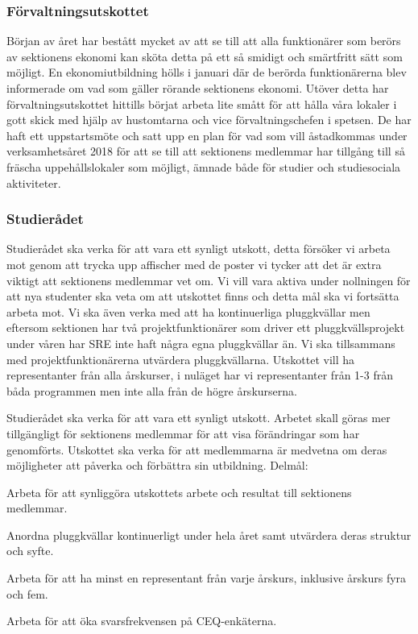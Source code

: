 \documentclass[../_main/handlingar.tex]{subfiles}
\begin{document}
\subsubsection*{Förvaltningsutskottet}
Början av året har bestått mycket av att se till att alla funktionärer som berörs av sektionens ekonomi kan sköta detta på ett så smidigt och smärtfritt sätt som möjligt.  
En ekonomiutbildning hölls i januari där de berörda funktionärerna blev informerade om vad som gäller rörande sektionens ekonomi.
Utöver detta har förvaltningsutskottet hittills börjat arbeta lite smått för att hålla våra lokaler i gott skick med hjälp av hustomtarna och vice förvaltningschefen i spetsen. De har haft ett uppstartsmöte och satt upp en plan för vad som vill åstadkommas under verksamhetsåret 2018 för att se till att sektionens medlemmar har tillgång till så fräscha uppehållslokaler som möjligt, ämnade både för studier och studiesociala aktiviteter.

\subsubsection*{Studierådet}
Studierådet ska verka för att vara ett synligt utskott, detta försöker vi arbeta mot genom att trycka upp affischer med de poster vi tycker att det är extra viktigt att sektionens medlemmar vet om. Vi vill vara aktiva under nollningen för att nya studenter ska veta om att utskottet finns och detta mål ska vi fortsätta arbeta mot. Vi ska även verka med att ha kontinuerliga pluggkvällar men eftersom sektionen har två projektfunktionärer som driver ett pluggkvällsprojekt under våren har SRE inte haft några egna pluggkvällar än. Vi ska tillsammans med projektfunktionärerna utvärdera pluggkvällarna. Utskottet vill ha representanter från alla årskurser, i nuläget har vi representanter från 1-3 från båda programmen men inte alla från de högre årskurserna.  

Studierådet ska verka för att vara ett synligt utskott. Arbetet skall göras mer tillgängligt för sektionens medlemmar för att visa förändringar som har genomförts. Utskottet ska verka för att medlemmarna är medvetna om deras möjligheter att påverka och förbättra sin utbildning.
Delmål:
\begin{dashlist}
    \item Arbeta för att synliggöra utskottets arbete och resultat till sektionens medlemmar. 
    \item Anordna pluggkvällar kontinuerligt under hela året samt utvärdera deras struktur och syfte.
    \item Arbeta för att ha minst en representant från varje årskurs, inklusive årskurs fyra och fem.
    \item Arbeta för att öka svarsfrekvensen på CEQ-enkäterna.
\end{dashlist}
\end{document}
